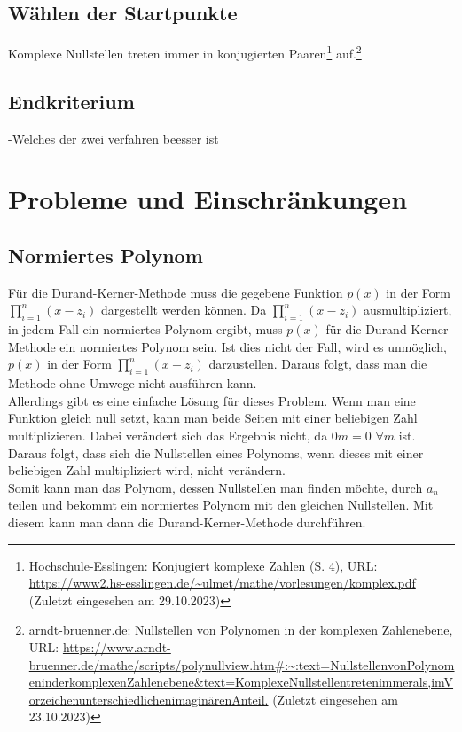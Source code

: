 \documentclass[12pt]{article}
\begin{document}
\subsection{Wählen der Startpunkte}
Komplexe Nullstellen treten immer in konjugierten Paaren\footnote{Hochschule-Esslingen: Konjugiert komplexe Zahlen (S. 4), URL: \url{https://www2.hs-esslingen.de/~ulmet/mathe/vorlesungen/komplex.pdf} (Zuletzt eingesehen am 29.10.2023)} auf.\footnote{arndt-bruenner.de: Nullstellen von Polynomen in der komplexen Zahlenebene, URL: \url{https://www.arndt-bruenner.de/mathe/scripts/polynullview.htm#:~:text=NullstellenvonPolynomeninderkomplexenZahlenebene&text=KomplexeNullstellentretenimmerals,imVorzeichenunterschiedlichenimaginärenAnteil.} (Zuletzt eingesehen am 23.10.2023)}

\subsection{Endkriterium}
-Welches der zwei verfahren beesser ist

\section{Probleme und Einschränkungen}
\subsection{Normiertes Polynom}
Für die Durand-Kerner-Methode muss die gegebene Funktion $p(x)$ in der Form $\prod_{i=1}^n (x-z_i)$ dargestellt werden können. Da $\prod_{i=1}^n (x-z_i)$ ausmultipliziert, in jedem Fall ein normiertes Polynom ergibt, muss $p(x)$ für die Durand-Kerner-Methode ein normiertes Polynom sein.
Ist dies nicht der Fall, wird es unmöglich, $p(x)$ in der Form $\prod_{i=1}^n (x-z_i)$ darzustellen. Daraus folgt, dass man die Methode ohne Umwege nicht ausführen kann. \\
Allerdings gibt es eine einfache Lösung für dieses Problem. Wenn man eine Funktion gleich null setzt, kann man beide Seiten mit einer beliebigen Zahl multiplizieren. Dabei verändert sich das Ergebnis nicht, da $0m = 0$ \space $\forall m$ ist. Daraus folgt, dass sich die Nullstellen eines Polynoms, wenn dieses mit einer beliebigen Zahl multipliziert wird, nicht verändern. \\
Somit kann man das Polynom, dessen Nullstellen man finden möchte, durch $a_n$ teilen und bekommt ein normiertes Polynom mit den gleichen Nullstellen. Mit diesem kann man dann die Durand-Kerner-Methode durchführen.
\end{document}
